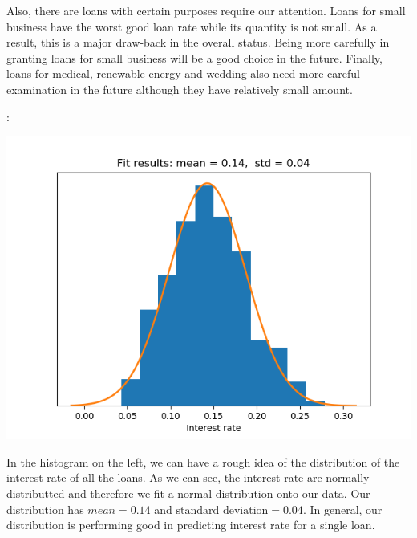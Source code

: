 \documentclass[10pt]{article}
\newenvironment{sect}[2][Section]{\begin{trivlist}
\item[\hskip \labelsep {\bfseries #2}]}{\end{trivlist}}
\begin{document}
\begin{sect}{Genral Purpose}
Also, there are loans with certain purposes require our attention. Loans for small business have the worst good loan rate while its quantity is not small. As a result, this is a major draw-back in the overall status. Being more carefully in granting loans for small business will be a good choice in the future. Finally, loans for medical, renewable energy and wedding also need more careful examination in the future although they have relatively small amount.
\end{sect}

\begin{sect}{Interest Rate}
:\\
\begin{minipage}{0.5\textwidth}
\includegraphics[width=\textwidth]{intrate_hist.png}
\end{minipage}
\begin{minipage}{0.5\textwidth}
In the histogram on the left, we can have a rough idea of the distribution of the interest rate of all the loans. As we can see, the interest rate are normally distributted and therefore we fit a normal distribution onto our data. Our distribution has $mean=0.14$ and $\text{standard deviation}=0.04$. In general, our distribution is performing good in predicting interest rate for a single loan.
\end{minipage}
\begin{center}
\footnotesize{}\\
\end{center}

\end{sect}
\end{document}
